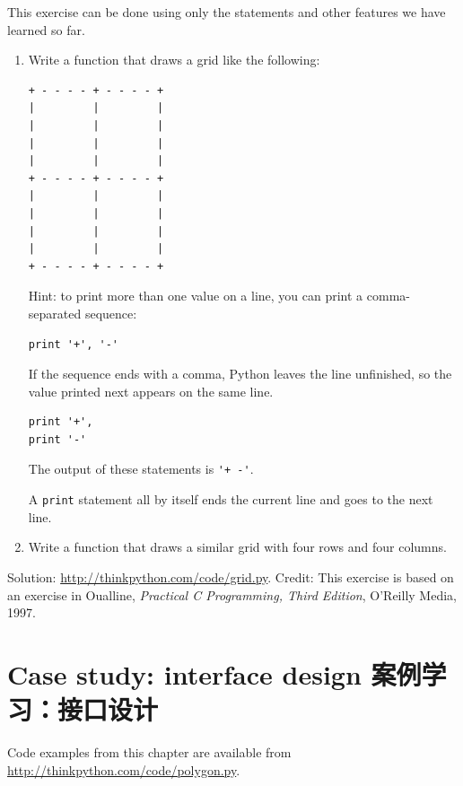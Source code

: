 \documentclass[10pt]{book}
\begin{document}
\begin{CJK}{UTF8}{gbsn}
\begin{exercise}
This exercise can be
done using only the statements and other features we have learned so
far.  

\begin{enumerate}

\item Write a function that draws a grid like the following:

\begin{verbatim}
+ - - - - + - - - - +
|         |         |
|         |         |
|         |         |
|         |         |
+ - - - - + - - - - +
|         |         |
|         |         |
|         |         |
|         |         |
+ - - - - + - - - - +
\end{verbatim}
%
Hint: to print more than one value on a line, you can print
a comma-separated sequence:

\begin{verbatim}
print '+', '-'
\end{verbatim}
%
If the sequence ends with a comma, Python leaves the line unfinished,
so the value printed next appears on the same line.

\begin{verbatim}
print '+', 
print '-'
\end{verbatim}
%
The output of these statements is \verb"'+ -'".

A {\tt print} statement all by itself ends the current line and
goes to the next line.

\item Write a function that draws a similar grid
with four rows and four columns.

\end{enumerate}

Solution: \url{http://thinkpython.com/code/grid.py}.
Credit: This exercise is based on an exercise in Oualline, {\em
    Practical C Programming, Third Edition}, O'Reilly Media, 1997.

\end{exercise}





\chapter{Case study: interface design 案例学习：接口设计}
\label{turtlechap}

Code examples from this chapter are available from
\url{http://thinkpython.com/code/polygon.py}.


\end{CJK}
\end{document}
